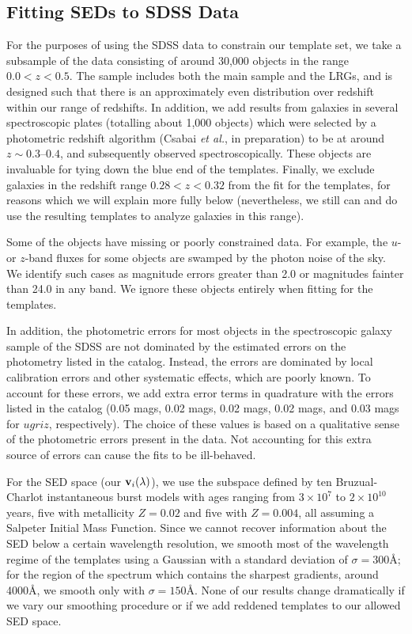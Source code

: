\documentclass[10pt,preprint]{aastex}
\newcommand{\vv}[1]{{\bf #1}}
\begin{document}
\subsection{Fitting SEDs to SDSS Data}

For the purposes of using the SDSS data to constrain our template set,
we take a subsample of the data consisting of around 30,000 objects in
the range $0.0<z<0.5$. The sample includes both the main sample and
the LRGs, and is designed such that there is an approximately even
distribution over redshift within our range of redshifts. In addition,
we add results from galaxies in several spectroscopic plates
(totalling about 1,000 objects) which were selected by a photometric
redshift algorithm (Csabai {\it et al.}, in preparation) to be at
around $z\sim 0.3$--$0.4$, and subsequently observed
spectroscopically. These objects are invaluable for tying down the
blue end of the templates.  Finally, we exclude galaxies in the
redshift range $0.28 <z<0.32$ from the fit for the templates, for
reasons which we will explain more fully below (nevertheless, we still
can and do use the resulting templates to analyze galaxies in this
range).

Some of the objects have missing or poorly constrained data. For
example, the $u$- or $z$-band fluxes for some objects are swamped by
the photon noise of the sky. We identify such cases as magnitude
errors greater than 2.0 or magnitudes fainter than 24.0 in any
band. We ignore these objects entirely when fitting for the
templates. 

In addition, the photometric errors for most objects in the
spectroscopic galaxy sample of the SDSS are not dominated by the
estimated errors on the photometry listed in the catalog. Instead, the
errors are dominated by local calibration errors and other systematic
effects, which are poorly known. To account for these errors, we add
extra error terms in quadrature with the errors listed in the catalog
(0.05 mags, 0.02 mags, 0.02 mags, 0.02 mags, and 0.03 mags for
$ugriz$, respectively). The choice of these values is based on a
qualitative sense of the photometric errors present in the data. Not
accounting for this extra source of errors can cause the fits to be
ill-behaved.

For the SED space (our $\vv{v}_i(\lambda)$), we use the subspace
defined by ten Bruzual-Charlot instantaneous burst models with ages
ranging from $3 \times 10^7$ to $2\times 10^{10}$ years, five with
metallicity $Z=0.02$ and five with $Z=0.004$, all assuming a Salpeter
Initial Mass Function. Since we cannot recover information about the
SED below a certain wavelength resolution, we smooth most of the
wavelength regime of the templates using a Gaussian with a standard
deviation of $\sigma = 300$\AA; for the region of the spectrum which
contains the sharpest gradients, around 4000\AA, we smooth only with
$\sigma = 150$\AA. None of our results change dramatically if we vary
our smoothing procedure or if we add reddened templates to our allowed
SED space.
\end{document}

